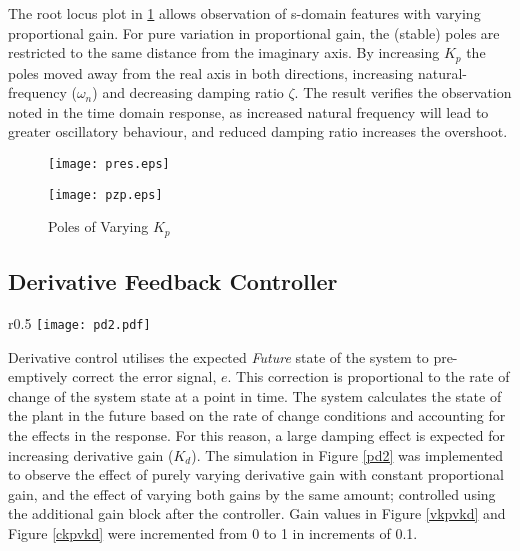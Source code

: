 The root locus plot in \ref{pzp} allows observation of s-domain features
with varying proportional gain. For pure variation in proportional gain,
the (stable) poles are restricted to the same distance from the
imaginary axis. By increasing \(K_p\) the poles moved away from the real
axis in both directions, increasing natural-frequency (\(\omega_n\)) and
decreasing damping ratio \(\zeta\). The result verifies the observation
noted in the time domain response, as increased natural frequency will
lead to greater oscillatory behaviour, and reduced damping ratio
increases the overshoot.

\begin{figure}[H]
\centering
\begin{minipage}{.455\textwidth}
 \centering
 \texttt{[image: pres.eps]}
 \caption{Response of Varying $K_p$}
 \label{pres}
\end{minipage}
\hfill
\begin{minipage}{.5\textwidth}
\centering
\texttt{[image: pzp.eps]}
\caption{Poles of Varying $K_p$}
\label{pzp}
\end{minipage}
\vspace{-20pt}
\end{figure}

\subsection{Derivative Feedback
Controller}\label{derivative-feedback-controller}

\begin{wrapfigure}{r}{0.5\textwidth}
\centering
\vspace{-35pt} %
\texttt{[image: pd2.pdf]}
\vspace{-10pt}
\caption{PD Feedback Controller}
\label{pd2}
\vspace{-25pt}
\end{wrapfigure}

Derivative control utilises the expected \emph{Future} state of the
system to pre-emptively correct the error signal, \(e\). This correction
is proportional to the rate of change of the system state at a point in
time. The system calculates the state of the plant in the future based
on the rate of change conditions and accounting for the effects in the
response. For this reason, a large damping effect is expected for
increasing derivative gain (\(K_d\)). The simulation in Figure \ref{pd2}
was implemented to observe the effect of purely varying derivative gain
with constant proportional gain, and the effect of varying both gains by
the same amount; controlled using the additional gain block after the
controller. Gain values in Figure \ref{vkpvkd} and Figure \ref{ckpvkd}
were incremented from 0 to 1 in increments of 0.1.

